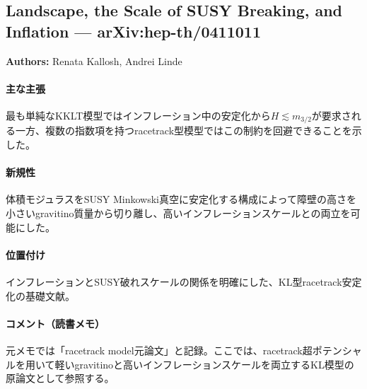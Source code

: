 \subsection{Landscape, the Scale of SUSY Breaking, and Inflation --- arXiv:hep-th/0411011}

\textbf{Authors:} Renata Kallosh, Andrei Linde

\paragraph{主な主張}
最も単純なKKLT模型ではインフレーション中の安定化から$H\lesssim m_{3/2}$が要求される一方、複数の指数項を持つracetrack型模型ではこの制約を回避できることを示した\cite{Kallosh:2004yh}。

\paragraph{新規性}
体積モジュラスをSUSY Minkowski真空に安定化する構成によって障壁の高さを小さいgravitino質量から切り離し、高いインフレーションスケールとの両立を可能にした。

\paragraph{位置付け}
インフレーションとSUSY破れスケールの関係を明確にした、KL型racetrack安定化の基礎文献。

\paragraph{コメント（読書メモ）}
元メモでは「racetrack model元論文」と記録。ここでは、racetrack超ポテンシャルを用いて軽いgravitinoと高いインフレーションスケールを両立するKL模型の原論文として参照する。

